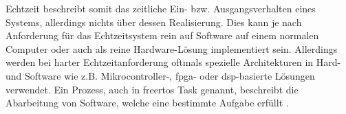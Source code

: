 \documentclass[../EDF Master Thesis.tex]{subfiles}
\begin{document}
    \clearpage

    Echtzeit beschreibt somit das zeitliche Ein- bzw. Ausgangsverhalten eines Systems, allerdings nichts über dessen Realisierung.
    Dies kann je nach Anforderung für das Echtzeitsystem rein auf Software auf einem normalen Computer oder auch als reine Hardware-Lösung implementiert sein.
    Allerdings werden bei harter Echtzeitanforderung oftmals spezielle Architekturen in Hard- und Software wie z.B. Mikrocontroller-, \ac{fpga}- oder \ac{dsp}-basierte Lösungen verwendet.
    Ein Prozess, auch in \ac{freertos} Task genannt, beschreibt die Abarbeitung von Software, welche eine bestimmte Aufgabe erfüllt \autocite{echtzeit_systeme}.

    \clearpage
\end{document}
